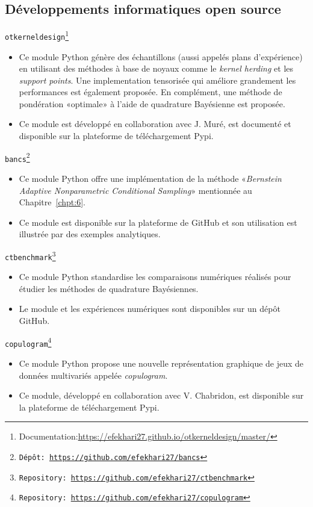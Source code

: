 \subsection*{D\'{e}veloppements informatiques open source}
\noindent
\texttt{otkerneldesign}\footnote{Documentation:\url{https://efekhari27.github.io/otkerneldesign/master/}}
\begin{itemize}
    \item[\textbullet] Ce module Python g\'{e}nère des \'{e}chantillons (aussi appel\'{e}s plans d'exp\'{e}rience) en utilisant des m\'{e}thodes à base de noyaux comme le \textit{kernel herding} et les \textit{support points}. Une implementation tensoris\'{e}e qui am\'{e}liore grandement les performances est \'{e}galement propos\'{e}e. En compl\'{e}ment, une m\'{e}thode de pond\'{e}ration «optimale» à l'aide de quadrature Bay\'{e}sienne est propos\'{e}e. 
    \item[\textbullet] Ce module est d\'{e}velopp\'{e} en collaboration avec J. Mur\'{e}, est document\'{e} et disponible sur la plateforme de t\'{e}l\'{e}chargement Pypi.
\end{itemize}

\noindent
\texttt{bancs\footnote{D\'{e}pôt: \url{https://github.com/efekhari27/bancs}}}     
\begin{itemize}
    \item[\textbullet] Ce module Python offre une impl\'{e}mentation de la m\'{e}thode «\textit{Bernstein Adaptive Nonparametric Conditional Sampling}» mentionn\'{e}e au Chapitre~\ref{chpt:6}. 
    \item[\textbullet] Ce module est disponible sur la plateforme de GitHub et son utilisation est illustr\'{e}e par des exemples analytiques.
\end{itemize}

\noindent
\texttt{ctbenchmark\footnote{Repository: \url{https://github.com/efekhari27/ctbenchmark}}}    
\begin{itemize}
    \item[\textbullet] Ce module Python standardise les comparaisons num\'{e}riques r\'{e}alis\'{e}s pour \'{e}tudier les m\'{e}thodes de quadrature Bay\'{e}siennes.      
    \item[\textbullet] Le module et les exp\'{e}riences num\'{e}riques sont disponibles sur un d\'{e}pôt GitHub.
\end{itemize}

\noindent
\texttt{copulogram\footnote{Repository: \url{https://github.com/efekhari27/copulogram}}} 
\begin{itemize}
    \item[\textbullet] Ce module Python propose une nouvelle repr\'{e}sentation graphique de jeux de donn\'{e}es multivari\'{e}s appel\'{e}e \textit{copulogram}.
    \item[\textbullet] Ce module, d\'{e}velopp\'{e} en collaboration avec V. Chabridon, est disponible sur la plateforme de t\'{e}l\'{e}chargement Pypi.
\end{itemize}
